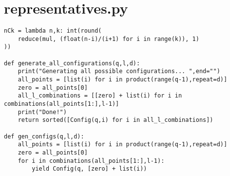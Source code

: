 \documentclass[12pt]{amsart}
\theoremstyle{plain}
\begin{document}
%
%
%
%
%
%
%
%
%
%

\newpage

\appendix
\section{representatives.py}
\begin{verbatim}
nCk = lambda n,k: int(round(
    reduce(mul, (float(n-i)/(i+1) for i in range(k)), 1)
))

def generate_all_configurations(q,l,d):
    print("Generating all possible configurations... ",end="")
    all_points = [list(i) for i in product(range(q-1),repeat=d)]
    zero = all_points[0]
    all_l_combinations = [[zero] + list(i) for i in combinations(all_points[1:],l-1)]
    print("Done!")
    return sorted([Config(q,i) for i in all_l_combinations])

def gen_configs(q,l,d):
    all_points = [list(i) for i in product(range(q-1),repeat=d)]
    zero = all_points[0]
    for i in combinations(all_points[1:],l-1):
        yield Config(q, [zero] + list(i))
\end{verbatim}
\end{document}
